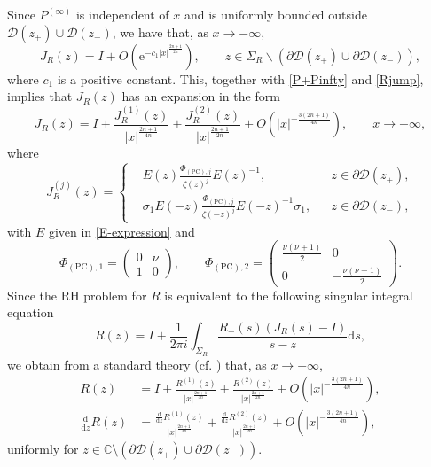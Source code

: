 \documentclass[11pt,a4paper]{article}
\numberwithin{equation}{section}
\begin{document}
Since $P^{(\infty)}$ is independent of $x$ and is uniformly bounded outside $\mathcal{D}(z_+)\cup \mathcal{D}(z_-)$, we have that, as $x\to-\infty$,
$$
J_R(z)=I+O\left(\text{e}^{-c_1|x|^{\frac{2n+1}{2n}}}\right), \qquad z\in \Sigma_R\backslash\left(\partial\mathcal{D}(z_+)\cup\partial \mathcal{D}(z_-)\right),
$$
where $c_1$ is a positive constant. This, together with \eqref{P+Pinfty} and \eqref{Rjump}, implies that $J_R(z)$ has an expansion in the form
\begin{equation}\label{Rjump-estimate}
J_R(z)=I+\frac{J_R^{(1)}(z)}{|x|^{\frac{2n+1}{4n}}}
+\frac{J_R^{(2)}(z)}{|x|^{\frac{2n+1}{2n}}}+O\left(|x|^{-\frac{3(2n+1)}{4n}}\right), \qquad x\to-\infty,
\end{equation}
where
\begin{equation}\label{Rjump12}
J_R^{(j)}(z)=\left\{\begin{aligned}
&E(z)\frac{\Phi_{(\mathrm{PC}), j}}{\zeta(z)^j} E(z)^{-1}, && z\in\partial\mathcal{D}(z_+), \\
&\sigma_1E(-z)\frac{\Phi_{(\mathrm{PC}), j}}{\zeta(-z)^j} E(-z)^{-1}\sigma_1, && z\in\partial\mathcal{D}(z_-),
\end{aligned}\right.
\end{equation}
with $E$ given in \eqref{E-expression} and
$$
\Phi_{(\mathrm{PC}), 1}=\begin{pmatrix} 0 & \nu \\ 1 & 0\end{pmatrix},\qquad
\Phi_{(\mathrm{PC}), 2}=\begin{pmatrix} \frac{\nu(\nu+1)}{2} & 0 \\ 0 & -\frac{\nu(\nu-1)}{2}\end{pmatrix}.
$$
Since the RH problem for $R$ is equivalent to the following singular integral equation
\begin{equation}
R(z)=I+\frac{1}{2\pi i}\int_{\Sigma_R}\frac{R_{-}(s)\left(J_R(s)-I\right)}{s-z}\mathrm{d}s,
\end{equation}
we obtain from a standard theory  (cf. \cite{Deift}) that, as $x\to -\infty$,
\begin{align}
R(z)&=I+\frac{R^{(1)}(z)}{|x|^{\frac{2n+1}{4n}}}+\frac{R^{(2)}(z)}{|x|^{\frac{2n+1}{2n}}}
+O\left(|x|^{-\frac{3(2n+1)}{4n}}\right), \label{R-estimation}\\
\frac{\mathrm{d}}{\mathrm{d}z}R(z)
&=\frac{\frac{\mathrm{d}}{\mathrm{d}z}R^{(1)}(z)}{|x|^{\frac{2n+1}{4n}}}
+\frac{\frac{\mathrm{d}}{\mathrm{d}z}R^{(2)}(z)}{|x|^{\frac{2n+1}{2n}}}
+O\left(|x|^{-\frac{3(2n+1)}{4n}}\right), \label{dR-estimation}
\end{align}
uniformly for $z\in \mathbb{C} \setminus
(\partial\mathcal{D}(z_+)\cup\partial\mathcal{D}(z_-))
$.
\end{document}
